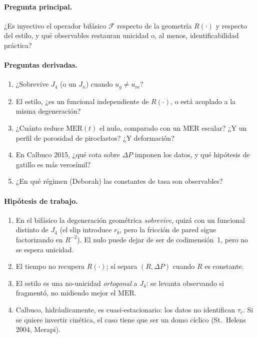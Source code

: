 \documentclass[11pt,a4paper]{article}
\theoremstyle{plain}
\theoremstyle{definition}
\theoremstyle{remark}
\newcommand{\MER}{\mathrm{MER}}
\newcommand{\F}{\mathcal{F}}
\begin{document}
\paragraph{Pregunta principal.}
¿Es inyectivo el operador bifásico $\F$ respecto de la geometría
$R(\cdot)$ y respecto del estilo, y qué observables restauran
unicidad o, al menos, identificabilidad práctica?

\paragraph{Preguntas derivadas.}
\begin{enumerate}
\item ¿Sobrevive $J_4$ (o un $J_n$) cuando $u_g\neq u_m$?
\item El estilo, ¿es un funcional independiente de $R(\cdot)$, o
  está acoplado a la misma degeneración?
\item ¿Cuánto reduce $\MER(t)$ el nulo, comparado con un $\MER$
  escalar? ¿Y un perfil de porosidad de piroclastos? ¿Y
  deformación?
\item En Calbuco 2015, ¿qué cota sobre $\Delta P$ imponen los
  datos, y qué hipótesis de gatillo es más verosímil?
\item ¿En qué régimen (Deborah) las constantes de tasa son
  observables?
\end{enumerate}

\paragraph{Hipótesis de trabajo.}
\begin{enumerate}
\item En el bifásico la degeneración geométrica \emph{sobrevive},
  quizá con un funcional distinto de $J_4$ (el slip introduce
  $r_b$, pero la fricción de pared sigue factorizando en
  $R^{-2}$). El nulo puede dejar de ser de codimensión~1, pero no
  se espera unicidad.
\item El tiempo no recupera $R(\cdot)$; sí separa $(R,\Delta P)$
  cuando $R$ es constante.
\item El estilo es una no-unicidad \emph{ortogonal} a $J_4$: se
  levanta observando si fragmentó, no midiendo mejor el $\MER$.
\item Calbuco, hidráulicamente, es cuasi-estacionario: los datos
  no identifican $\tau_c$. Si se quiere invertir cinética, el
  caso tiene que ser un domo cíclico (St.\ Helens 2004, Merapi).
\end{enumerate}
\end{document}
